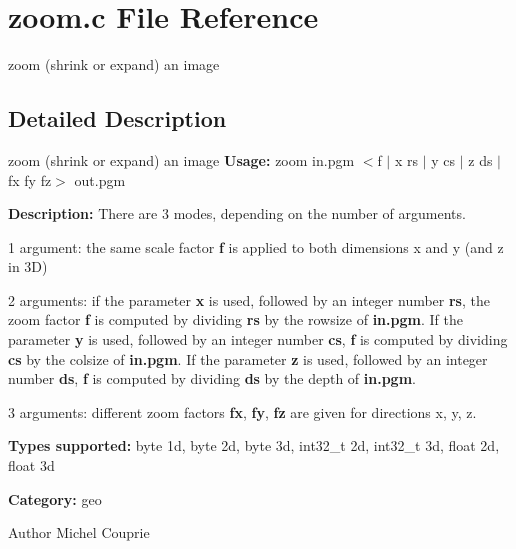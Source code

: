 \section{zoom.c File Reference}
\label{zoom_8c}


zoom (shrink or expand) an image  




\subsection{Detailed Description}
zoom (shrink or expand) an image {\bfseries Usage:} zoom in.pgm $<$f $|$ x rs $|$ y cs $|$ z ds $|$ fx fy fz$>$ out.pgm

{\bfseries Description:} There are 3 modes, depending on the number of arguments.

1 argument: the same scale factor {\bfseries f} is applied to both dimensions x and y (and z in 3D)

2 arguments: if the parameter {\bfseries x} is used, followed by an integer number {\bfseries rs}, the zoom factor {\bfseries f} is computed by dividing {\bfseries rs} by the rowsize of {\bfseries in.pgm}. If the parameter {\bfseries y} is used, followed by an integer number {\bfseries cs}, {\bfseries f} is computed by dividing {\bfseries cs} by the colsize of {\bfseries in.pgm}. If the parameter {\bfseries z} is used, followed by an integer number {\bfseries ds}, {\bfseries f} is computed by dividing {\bfseries ds} by the depth of {\bfseries in.pgm}.

3 arguments: different zoom factors {\bfseries fx}, {\bfseries fy}, {\bfseries fz} are given for directions x, y, z.

{\bfseries Types supported:} byte 1d, byte 2d, byte 3d, int32\_\-t 2d, int32\_\-t 3d, float 2d, float 3d

{\bfseries Category:} geo

\begin{DoxyAuthor}{Author}
Michel Couprie 
\end{DoxyAuthor}
